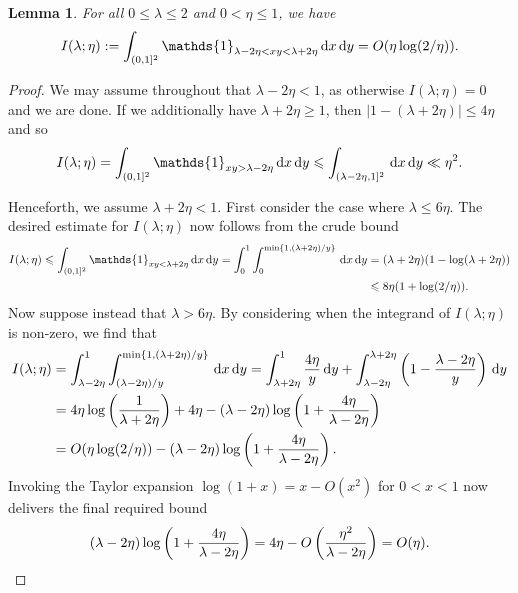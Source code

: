 \documentclass[12pt,reqno]{amsart}
\newtheorem{lemma}[theorem]{Lemma}
\theoremstyle{definition}
\theoremstyle{remark}
\numberwithin{equation}{section}
\def\d{{\,{\rm d}}}
\newcommand\1{\mathds{1}}
\begin{document}
\begin{lemma}\label{lem5.2}
For all $0\leqslant \lambda\leqslant 2$ and $0<\eta\leqslant 1$, we have
    \begin{equation*}
       I(\lambda;\eta):= \int_{(0,1]^2} \1_{ \lambda - 2 \eta < xy < \lambda + 2\eta }\d x \d y = O(\eta\log(2/\eta)).
    \end{equation*}
\end{lemma}
\begin{proof}
    We may assume throughout that $\lambda-2\eta<1$, as otherwise $I(\lambda;\eta)=0$ and we are done.
    If we additionally have $\lambda + 2\eta\geqslant 1$, then $|1-(\lambda +2\eta)|\leqslant 4\eta$ and so
    \begin{equation*}
        I(\lambda;\eta) = \int_{(0,1]^2} \1_{xy > \lambda - 2\eta }\d x \d y \leqslant \int_{(\lambda - 2\eta,1]^2} \d x\d y \ll \eta^2.
    \end{equation*}

    Henceforth, we assume $\lambda + 2\eta<1$. First consider the case where $\lambda\leqslant 6\eta$. The desired estimate for $I(\lambda;\eta)$ now follows from the crude bound
    \begin{align*}
        I(\lambda;\eta)\leqslant \int_{(0,1]^2} \1_{xy < \lambda + 2\eta }\d x \d y = \int_0^1\int_0^{\min\{1,(\lambda+2\eta)/y\}}\d x \d y &= (\lambda + 2\eta)(1-\log (\lambda + 2\eta))\\
        & \leqslant 8\eta(1+\log(2/\eta)).
    \end{align*}
    Now suppose instead that $\lambda>6\eta$. By considering when the integrand of $I(\lambda;\eta)$ is non-zero, we find that
    \begin{align*}
        I(\lambda;\eta) &= \int_{\lambda - 2\eta}^1\int_{(\lambda -2\eta)/y}^{\min\{1,(\lambda + 2\eta)/y\}} \d x \d y = \int_{\lambda + 2\eta}^1 \frac{4\eta}{y}\d y + \int_{\lambda -2\eta}^{\lambda + 2\eta}\left(1 - \frac{\lambda - 2\eta}{y}\right)\d y\\
        & = 4\eta \log\left(\frac{1}{\lambda + 2\eta}\right) + 4\eta - (\lambda- 2\eta)\log\left(1+\frac{4\eta}{\lambda - 2\eta}\right)\\
        &= O(\eta\log(2/\eta)) -(\lambda- 2\eta)\log\left(1+\frac{4\eta}{\lambda - 2\eta}\right). 
    \end{align*}
    Invoking the Taylor expansion $\log(1+x) = x -O(x^2)$ for $0<x<1$ now delivers the final required bound
    \begin{equation*}
        (\lambda- 2\eta)\log\left(1+\frac{4\eta}{\lambda - 2\eta}\right) = 4\eta - O\left( \frac{\eta^2}{\lambda - 2\eta}\right) = O(\eta).\qedhere
    \end{equation*}
\end{proof}
\end{document}
